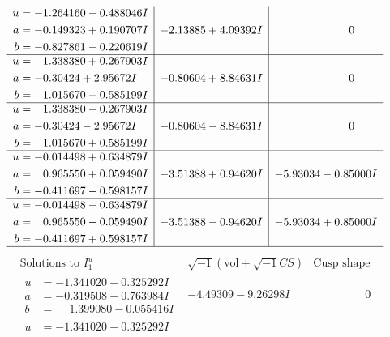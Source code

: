 \documentclass[1p]{elsarticle_modified}
\theoremstyle{definition}
\newcommand{\I}{\sqrt{-1}}
\begin{document}
$$\begin{array}{c|c|c}
\begin{aligned}
u &= -1.264160 - 0.488046 I \\
a &= -0.149323 + 0.190707 I \\
b &= -0.827861 - 0.220619 I\end{aligned}
 & -2.13885 + 4.09392 I & \phantom{-0.000000 } 0 \\ \hline\begin{aligned}
u &= \phantom{-}1.338380 + 0.267903 I \\
a &= -0.30424 + 2.95672 I \\
b &= \phantom{-}1.015670 - 0.585199 I\end{aligned}
 & -0.80604 + 8.84631 I & \phantom{-0.000000 } 0 \\ \hline\begin{aligned}
u &= \phantom{-}1.338380 - 0.267903 I \\
a &= -0.30424 - 2.95672 I \\
b &= \phantom{-}1.015670 + 0.585199 I\end{aligned}
 & -0.80604 - 8.84631 I & \phantom{-0.000000 } 0 \\ \hline\begin{aligned}
u &= -0.014498 + 0.634879 I \\
a &= \phantom{-}0.965550 + 0.059490 I \\
b &= -0.411697 - 0.598157 I\end{aligned}
 & -3.51388 + 0.94620 I & -5.93034 - 0.85000 I \\ \hline\begin{aligned}
u &= -0.014498 - 0.634879 I \\
a &= \phantom{-}0.965550 - 0.059490 I \\
b &= -0.411697 + 0.598157 I\end{aligned}
 & -3.51388 - 0.94620 I & -5.93034 + 0.85000 I\\
 \hline 
 \end{array}$$\newpage$$\begin{array}{c|c|c}  
\text{Solutions to }I^u_{1}& \I (\text{vol} + \sqrt{-1}CS) & \text{Cusp shape}\\
 \hline 
\begin{aligned}
u &= -1.341020 + 0.325292 I \\
a &= -0.319508 - 0.763984 I \\
b &= \phantom{-}1.399080 - 0.055416 I\end{aligned}
 & -4.49309 - 9.26298 I & \phantom{-0.000000 } 0 \\ \hline\begin{aligned}
u &= -1.341020 - 0.325292 I \\

\end{aligned}
\end{array}$$
\end{document}
